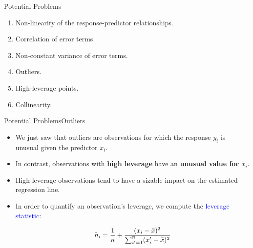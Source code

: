 \begin{frame}[noframenumbering]{Potential Problems}


\begin{enumerate}
    \item<1> Non-linearity of the response-predictor relationships.
    \item<1> Correlation of error terms.
    \item<1> Non-constant variance of error terms.
    \item<1> Outliers.
    \item<1-2> High-leverage points.
    \item<1> Collinearity.
\end{enumerate}
    
\end{frame}

\begin{frame}{Potential Problems}{Outliers}

\begin{itemize}
    \item We just saw that outliers are observations for which the response $y_i$ is unusual given the predictor $x_i$. \pause 
    
    \item In contrast, observations with \textbf{high leverage} have an \textbf{unusual value for $x_i$}. \pause
    
    \item High leverage observations tend to have a sizable impact on the estimated regression line. \pause
    
    \item In order to quantify an observation’s leverage, we compute the \textcolor{blue}{leverage statistic}: \pause

    $$h_i = \frac{1}{n} + \frac{(x_i - \Bar{x})^2}{\sum_{i'=1}^n (x_i' - \Bar{x})^2 }$$ \pause

    \end{itemize}
    \end{frame}

